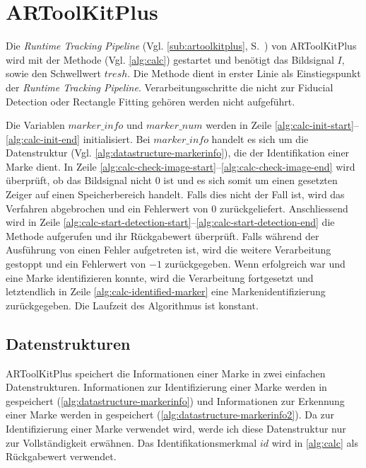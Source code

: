 \section{ARToolKitPlus} %
\label{sec:artoolkitplus}

Die \textit{Runtime Tracking Pipeline} (Vgl. \autoref{sub:artoolkitplus}, S.~\pageref{sub:artoolkitplus}) von
 ARToolKitPlus wird mit der Methode  (Vgl. \autoref{alg:calc}) gestartet und benötigt das Bildsignal
 $I$, sowie den Schwellwert $\mathit{tresh}$. Die Methode  dient in erster Linie als Einstiegspunkt der
 \textit{Runtime Tracking Pipeline}. Verarbeitungsschritte die nicht zur Fiducial Detection oder Rectangle
 Fitting gehören werden nicht aufgeführt.



Die Variablen $\mathit{marker\_info}$ und $\mathit{marker\_num}$ werden in Zeile
 \ref{alg:calc-init-start}--\ref{alg:calc-init-end} initialisiert. Bei $\mathit{marker\_info}$ handelt es sich um die
 Datenstruktur  (Vgl. \autoref{alg:datastructure-markerinfo}), die der Identifikation einer Marke
 dient. In Zeile \ref{alg:calc-check-image-start}--\ref{alg:calc-check-image-end} wird überprüft, ob das Bildsignal
 nicht $0$ ist und es sich somit um einen gesetzten Zeiger auf einen Speicherbereich handelt. Falls dies nicht der Fall
 ist, wird das Verfahren abgebrochen und ein Fehlerwert von $0$ zurückgeliefert. Anschliessend wird in Zeile
 \ref{alg:calc-start-detection-start}--\ref{alg:calc-start-detection-end} die Methode 
 aufgerufen und ihr Rückgabewert überprüft. Falls während der Ausführung von  einen Fehler
 aufgetreten ist, wird die weitere Verarbeitung gestoppt und ein Fehlerwert von $-1$ zurückgegeben. Wenn
  erfolgreich war und eine Marke identifizieren konnte, wird die Verarbeitung fortgesetzt und
 letztendlich in Zeile \ref{alg:calc-identified-marker} eine Markenidentifizierung zurückgegeben. Die Laufzeit des
 Algorithmus ist konstant.

\subsection{Datenstrukturen} %
\label{sec:datenstrukturen}

ARToolKitPlus speichert die Informationen einer Marke in zwei einfachen Datenstrukturen. Informationen zur
 Identifizierung einer Marke werden in  gespeichert (\autoref{alg:datastructure-markerinfo}) und
 Informationen zur Erkennung einer Marke werden in  gespeichert
 (\autoref{alg:datastructure-markerinfo2}). Da  zur Identifizierung einer Marke verwendet wird,
 werde ich diese Datenstruktur nur zur Vollständigkeit erwähnen. Das Identifikationsmerkmal $\mathit{id}$ wird in
 \autoref{alg:calc} als Rückgabewert verwendet.

